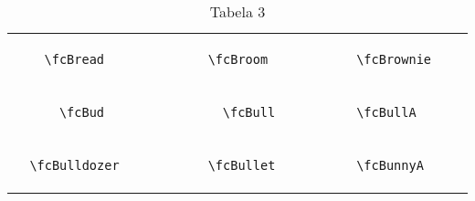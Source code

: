 \documentclass[x11names]{article}
\begin{document}
\begin{table}[H]
\begin{tabular}{|c|c|c|c|c|c|}
		&\multirow{5}{*}{	\fcBread	[scale=0.4]} & &\multirow{5}{*}{	\fcBroom	[scale=0.5]} & &\multirow{5}{*}{	\fcBrownie	[scale=0.4]}\\	& & & & & \\	& & & & & \\	\verb|	\fcBread	| & & \verb|	\fcBroom	| & & \verb|	\fcBrownie	| & \\	& & & & & \\	& & & & & \\	& & & & & \\	\hline									
		&\multirow{5}{*}{	\fcBud	[scale=0.4]} & &\multirow{5}{*}{	\fcBull	[scale=0.8]} & &\multirow{5}{*}{	\fcBullA	[scale=0.4]}\\	& & & & & \\	& & & & & \\	\verb|	\fcBud	| & & \verb|	\fcBull	| & & \verb|	\fcBullA	| & \\	& & & & & \\	& & & & & \\	& & & & & \\	\hline									
		&\multirow{5}{*}{	\fcBulldozer	[scale=0.4]} & &\multirow{5}{*}{	\fcBullet	[scale=0.8]} & &\multirow{5}{*}{	\fcBunnyA	[scale=0.4]}\\	& & & & & \\	& & & & & \\	\verb|	\fcBulldozer	| & & \verb|	\fcBullet	| & & \verb|	\fcBunnyA	| & \\	& & & & & \\	& & & & & \\	& & & & & \\		\hline 	\hline 	\end{tabular}	\caption{	Tabela 3	}\label{	Tab3	}\end{table}
\end{document}
